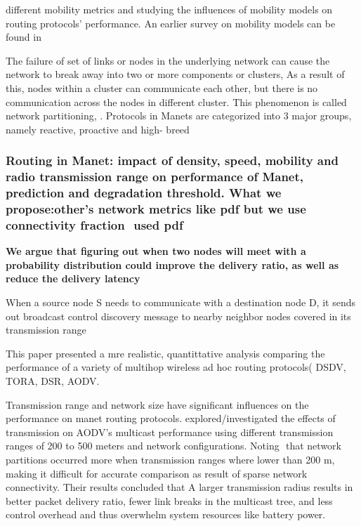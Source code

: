 \documentclass[letterpaper, 10 pt, conference]{ieeeconf}  %
\begin{document}
different mobility metrics and studying the influences of mobility models on routing protocols’ performance. An earlier survey on mobility models can be found in



The failure of set of links or nodes in the underlying network can cause the network to break away into two or more components or
clusters,  As a result of this, nodes within a cluster can communicate each other, but there is no communication across the nodes in different cluster. This phenomenon is called network partitioning, . Protocols in Manets are categorized into 3 major groups, namely reactive, proactive and high- breed





\subsubsection{Routing in Manet: impact of density, speed, mobility and radio transmission range on performance of Manet, prediction and degradation threshold. What we propose:other's network metrics like pdf but we use connectivity fraction  used pdf}
\textbf{We argue that figuring out when two nodes
will meet with a probability distribution could improve the
delivery ratio, as well as reduce the delivery latency}



 When a source node S needs to communicate with a destination node D, it sends out broadcast control discovery message to nearby neighbor nodes covered in its transmission range




\cite{BrochAProtocols}This paper presented a mre realistic, quantittative analysis comparing the performance of a variety of multihop wireless ad hoc routing protocols( DSDV, TORA, DSR, AODV.

Transmission range and network size have significant influences on the performance on manet routing protocols.\cite{Belding-Royer2002TransmissionCommunication} explored/investigated the effects of transmission on AODV's multicast performance using different transmission ranges of 200 to 500 meters and network configurations. Noting  that network partitions occurred more when transmission ranges where lower than 200 m, making it difficult for accurate comparison as result of sparse network connectivity. Their results concluded that A larger transmission radius results in
better packet delivery ratio, fewer link breaks in the multicast tree, and less control overhead and thus overwhelm system resources like battery power.
\end{document}
